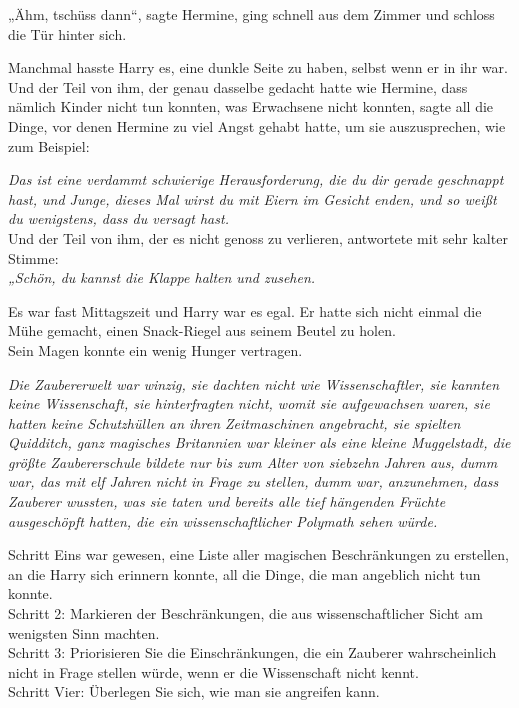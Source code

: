 {„Ähm, tschüss dann“, sagte Hermine, ging schnell aus dem Zimmer und schloss die Tür hinter sich.

Manchmal hasste Harry es, eine dunkle Seite zu haben, selbst wenn er in ihr war. Und der Teil von ihm, der genau dasselbe gedacht hatte wie Hermine, dass nämlich Kinder nicht tun konnten, was Erwachsene nicht konnten, sagte all die Dinge, vor denen Hermine zu viel Angst gehabt hatte, um sie auszusprechen, wie zum Beispiel:

\emph{Das ist eine verdammt schwierige Herausforderung, die du dir gerade geschnappt hast, und Junge, dieses Mal wirst du mit Eiern im Gesicht enden, und so weißt du wenigstens, dass du versagt hast.}\\ Und der Teil von ihm, der es nicht genoss zu verlieren, antwortete mit sehr kalter Stimme:\\ \emph{„Schön, du kannst die Klappe halten und zusehen.}

Es war fast Mittagszeit und Harry war es egal. Er hatte sich nicht einmal die Mühe gemacht, einen Snack-Riegel aus seinem Beutel zu holen.\\ Sein Magen konnte ein wenig Hunger vertragen.

\emph{Die Zaubererwelt war winzig, sie dachten nicht wie Wissenschaftler, sie kannten keine Wissenschaft, sie hinterfragten nicht, womit sie aufgewachsen waren, sie hatten keine Schutzhüllen an ihren Zeitmaschinen angebracht, sie spielten Quidditch, ganz magisches Britannien war kleiner als eine kleine Muggelstadt, die größte Zaubererschule bildete nur bis zum Alter von siebzehn Jahren aus, dumm war, das mit elf Jahren nicht in Frage zu stellen, dumm war, anzunehmen, dass Zauberer wussten, was sie taten und bereits alle tief hängenden Früchte ausgeschöpft hatten, die ein wissenschaftlicher Polymath sehen würde.}

Schritt Eins war gewesen, eine Liste aller magischen Beschränkungen zu erstellen, an die Harry sich erinnern konnte, all die Dinge, die man angeblich nicht tun konnte.\\ Schritt 2: Markieren der Beschränkungen, die aus wissenschaftlicher Sicht am wenigsten Sinn machten.\\ Schritt 3: Priorisieren Sie die Einschränkungen, die ein Zauberer wahrscheinlich nicht in Frage stellen würde, wenn er die Wissenschaft nicht kennt.\\ Schritt Vier: Überlegen Sie sich, wie man sie angreifen kann.

}
